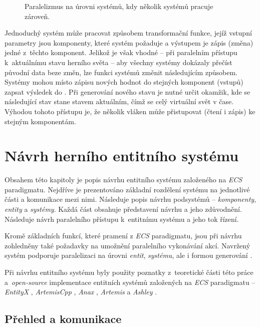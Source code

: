 \begin{figure}[H]
	\centering
	\caption{Paralelizmus na úrovni systémů, kdy několik systémů pracuje zároveň.}
	\label{Fig:PARSystem}
\end{figure}

Jednoduchý systém může pracovat způsobem transformační funkce, jejíž vstupní parametry jsou komponenty, které systém požaduje a výstupem je zápis (změna) jedné z~těchto komponent. Jelikož je však vhodné -- při paralelním přístupu k~aktuálnímu stavu herního světa -- aby všechny systémy dokázaly přečíst původní data beze změn, lze funkci systémů změnit následujícím způsobem. Systémy mohou místo zápisu nových hodnot do stejných komponent (vstupů) zapsat výsledek do  \cite{FrontierThreads}. Při generování nového stavu je nutné určit okamžik, kde se následující stav stane stavem aktuálním, čímž se celý virtuální svět  v čase. Výhodou tohoto přístupu je, že několik vláken může přistupovat (čtení i zápis) ke stejným komponentám.

\chapter{Návrh herního entitního systému}
\label{Chap:Design}

Obsahem této kapitoly je popis návrhu entitního systému založeného na \emph{ECS} paradigmatu. Nejdříve je prezentováno základní rozdělení systému na jednotlivé části a komunikace mezi nimi. Následuje popis návrhu podsystémů -- \emph{komponenty}, \emph{entity} a \emph{systémy}. Každá část obsahuje představení návrhu a jeho zdůvodnění. Následuje návrh paralelního přístupu k~entitnímu systému a jeho tok řízení.

Kromě základních funkcí, které pramení z \emph{ECS} paradigmatu, jsou při návrhu zohledněny také požadavky na umožnění paralelního vykonávání akcí. Navržený systém podporuje paralelizaci na úrovni \emph{entit}, \emph{systému}, ale i formou generování . 

Při návrhu entitního systému byly použity poznatky z~teoretické části této práce a~\emph{open-source} implementace entitních systémů založených na \emph{ECS} paradigmatu -- \emph{EntityX} \cite{EntityX}, \emph{ArtemisCpp} \cite{ArtemisCpp}, \emph{Anax} \cite{Anax}, \emph{Artemis} \cite{ArtemisJava} a \emph{Ashley} \cite{Ashley}.

\section{Přehled a komunikace}

